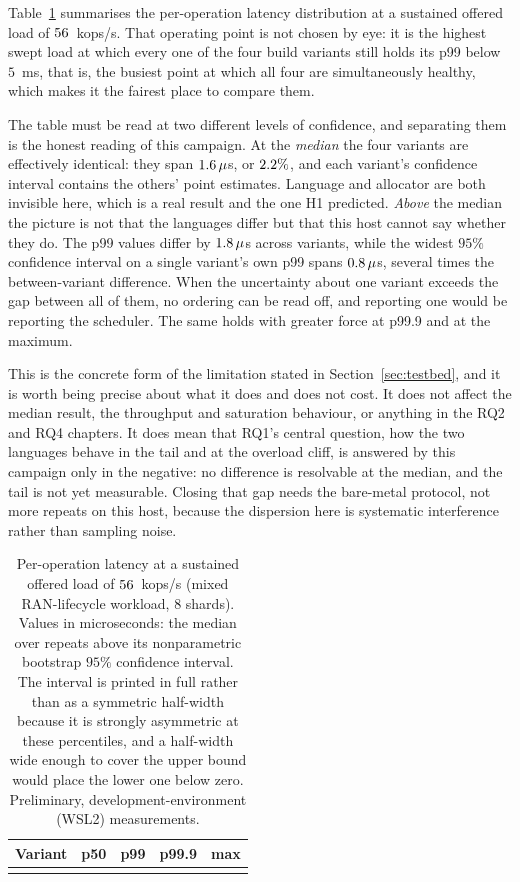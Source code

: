 \documentclass[english,twoside,openright,a4paper,censored,csm,software-track-2020]{HYthesisML}
\begin{document}
Table~\ref{tab:latency} summarises the per-operation latency distribution at a sustained
offered load of $56$~kops/s. That operating point is not chosen by eye: it is the
highest swept load at which every one of the four build variants still holds its p99 below
$5$~ms, that is, the busiest point at which all four are simultaneously healthy, which makes
it the fairest place to compare them.

The table must be read at two different levels of confidence, and separating them is the
honest reading of this campaign. At the \emph{median} the four variants are effectively
identical: they span $1.6\,\mu$s, or $2.2\%$, and each variant's confidence
interval contains the others' point estimates. Language and allocator are both invisible here,
which is a real result and the one H1 predicted. \emph{Above} the median the picture is not
that the languages differ but that this host cannot say whether they do. The p99 values differ
by $1.8\,\mu$s across variants, while the widest $95\%$ confidence interval on a
single variant's own p99 spans $0.8\,\mu$s, several times the between-variant
difference. When the uncertainty about one variant exceeds the gap between all of them, no
ordering can be read off, and reporting one would be reporting the scheduler. The same holds
with greater force at p99.9 and at the maximum.

This is the concrete form of the limitation stated in Section~\ref{sec:testbed}, and it is
worth being precise about what it does and does not cost. It does not affect the median
result, the throughput and saturation behaviour, or anything in the RQ2 and RQ4 chapters. It
does mean that RQ1's central question, how the two languages behave in the tail and at the
overload cliff, is answered by this campaign only in the negative: no difference is resolvable
at the median, and the tail is not yet measurable. Closing that gap needs the bare-metal
protocol, not more repeats on this host, because the dispersion here is systematic
interference rather than sampling noise.

\begin{table}
\centering
\small
\caption{Per-operation latency at a sustained offered load of $56$~kops/s (mixed
RAN-lifecycle workload, $8$ shards). Values in microseconds: the median over \NRepeats{}
repeats above its nonparametric bootstrap $95\%$ confidence interval. The interval is printed
in full rather than as a symmetric half-width because it is strongly asymmetric at these
percentiles, and a half-width wide enough to cover the upper bound would place the lower one
below zero. Preliminary, development-environment (WSL2)
measurements.\label{tab:latency}}
\begin{tabular}{@{}l r r r r@{}}
\hline\hline
Variant & p50 & p99 & p99.9 & max \\
\hline
\\
\hline
\end{tabular}
\end{table}
\end{document}

